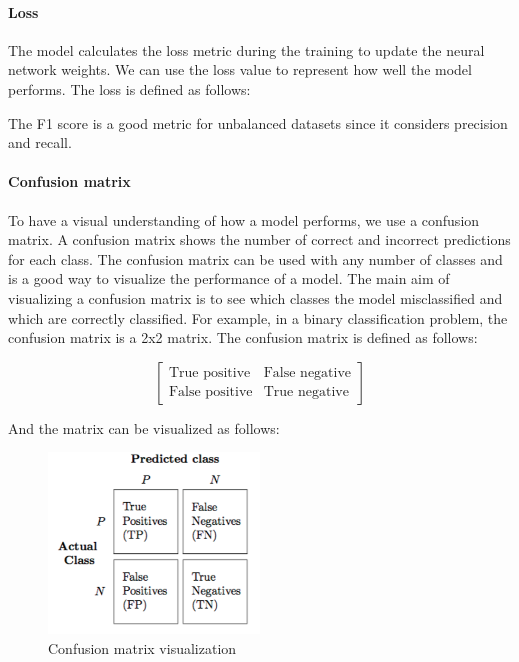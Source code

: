 \paragraph{Loss}

The model calculates the loss metric during the training to update the neural network weights. We can use the loss value to represent how well the model performs. The loss is defined as follows:

The F1 score is a good metric for unbalanced datasets since it considers precision and recall. 

\paragraph{Confusion matrix}

To have a visual understanding of how a model performs, we use a confusion matrix. A confusion matrix shows the number of correct and incorrect predictions for each class. The confusion matrix can be used with any number of classes and is a good way to visualize the performance of a model. The main aim of visualizing a confusion matrix is to see which classes the model misclassified and which are correctly classified. For example, in a binary classification problem, the confusion matrix is a 2x2 matrix. The confusion matrix is defined as follows:

\begin{equation}
    \begin{bmatrix}
        \text{True positive} & \text{False negative} \\
        \text{False positive} & \text{True negative}
    \end{bmatrix}
\end{equation}

And the matrix can be visualized as follows:

\begin{figure}[H]
    \centering
    \includegraphics[width=0.5\textwidth]{images/confusion_matrix_example.png}
    \caption{Confusion matrix visualization}
    \label{fig:binary_confusion_matrix}
\end{figure}

